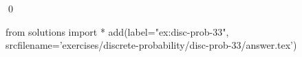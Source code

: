 
\begin{ex} 
  \label{ex:disc-prob-33}
  
  \qed
\end{ex} 
\begin{python0}
from solutions import *
add(label="ex:disc-prob-33",
    srcfilename='exercises/discrete-probability/disc-prob-33/answer.tex') 
\end{python0}
